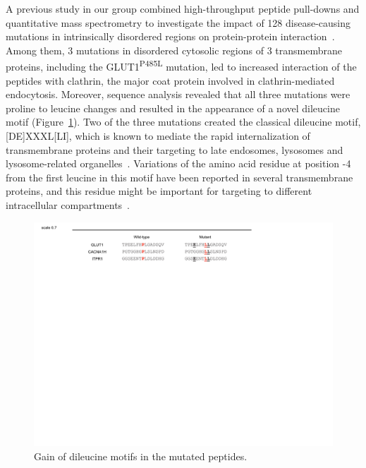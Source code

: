 A previous study in our group combined high-throughput peptide pull-downs and quantitative mass spectrometry to investigate the impact of 128 disease-causing mutations in intrinsically disordered regions on protein-protein interaction~\cite{Meyer2}. Among them, 3 mutations in disordered cytosolic regions of 3 transmembrane proteins, including the GLUT1\textsuperscript{P485L} mutation, led to increased interaction of the peptides with clathrin, the major coat protein involved in clathrin-mediated endocytosis. Moreover, sequence analysis revealed that all three mutations were proline to leucine changes and resulted in the appearance of a novel dileucine motif (Figure~\ref{fig:motif}). Two of the three mutations created the classical dileucine motif, [DE]XXXL[LI], which is known to mediate the rapid internalization of transmembrane proteins and their targeting to late endosomes, lysosomes and lysosome-related organelles~\cite{Bonifacino}. Variations of the amino acid residue at position -4 from the first leucine in this motif have been reported in several transmembrane proteins, and this residue might be important for targeting to different intracellular compartments~\cite{Bonifacino,Sandoval}.
\begin{figure}[h]
\centering
\includegraphics[scale=0.7]{Figures/motif}
\caption{Gain of dileucine motifs in the mutated peptides.}
\label{fig:motif}
\end{figure}

